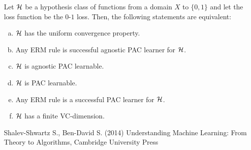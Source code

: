 \documentclass[11pt,a4paper]{article}
\begin{document}
\begin{theorem}
    Let $\mathcal{H}$ be a hypothesis class of functions from a domain $X$ to $\{0,1\}$ and let the loss function be the $0$-$1$ loss. Then, the following statements are equivalent:
    \begin{enumerate}[(a)]
        \item $\mathcal{H}$ has the uniform convergence property.
        \item Any ERM rule is successful agnostic PAC learner for $\mathcal{H}$.
        \item $\mathcal{H}$ is agnostic PAC learnable.
        \item $\mathcal{H}$ is PAC learnable.
        \item Any ERM rule is a successful PAC learner for $\mathcal{H}$.
        \item $\mathcal{H}$ has a finite VC-dimension.
    \end{enumerate}
\end{theorem}

\begin{thebibliography}{9}
Shalev-Shwartz S., Ben-David S. (2014) Understanding Machine Learning: From Theory to Algorithms, Cambridge University Press


\end{thebibliography}
\end{document}
